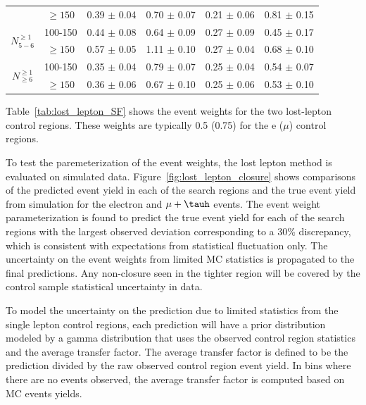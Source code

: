 \begin{table}
\begin{tabular}{c|c|c|c|c|c}
                          & $\geq 150$ & 0.39 $\pm$ 0.04 & 0.70 $\pm$ 0.07  & 0.21 $\pm$ 0.06 & 0.81 $\pm$ 0.15 \\ \cline{1-6}
\multirow{2}{*}{$N_{5-6}^{\geq 1}$}& 100-150    & 0.44 $\pm$ 0.08 & 0.64 $\pm$ 0.09  & 0.27 $\pm$ 0.09 & 0.45 $\pm$ 0.17 \\ \cline{2-6}
						  & $\geq 150$ & 0.57 $\pm$ 0.05 & 1.11 $\pm$ 0.10  & 0.27 $\pm$ 0.04 & 0.68 $\pm$ 0.10 \\ \cline{1-6}
\multirow{2}{*}{$N_{\geq 6}^{\geq 1}$} & 100-150    & 0.35 $\pm$ 0.04 & 0.79 $\pm$ 0.07  & 0.25 $\pm$ 0.04 & 0.54 $\pm$ 0.07 \\ \cline{2-6}
                          & $\geq 150$ & 0.36 $\pm$ 0.06 & 0.67 $\pm$ 0.10  & 0.25 $\pm$ 0.06 & 0.53 $\pm$ 0.10 \\\hline
\end{tabular}
\end{table}

Table~\ref{tab:lost_lepton_SF} shows the event weights for the two lost-lepton control regions.
These weights are typically 0.5 (0.75) for the e ($\mu$) control regions. 

To test the paremeterization of the event weights, the lost lepton method is evaluated 
on simulated data.  Figure~\ref{fig:lost_lepton_closure} shows comparisons of the predicted event yield
in each of the search regions and the true event yield from simulation for the electron
and $\mu+\tauh$ events.  The event weight parameterization is found to 
predict the true event yield for each of the search regions with the largest observed
deviation corresponding to a 30\% discrepancy, which is consistent with expectations
from statistical fluctuation only. 
The uncertainty on the event weights from limited MC statistics is propagated to the final predictions.
Any non-closure seen in the tighter \ptmiss region will be covered by the control sample statistical uncertainty in data.

To model the uncertainty on the prediction due to limited statistics from the single 
lepton control regions, each prediction will have a prior distribution modeled by
a gamma distribution that uses the observed control region statistics and the average 
transfer factor.  The average transfer factor is defined to be the prediction 
divided by the raw observed control region event yield.  In bins where there are
no events observed, the average transfer factor is computed based on MC events 
yields.  

